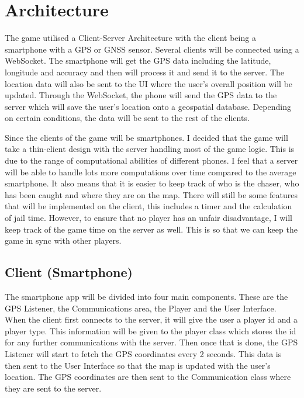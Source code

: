 \documentclass{l4proj}
\begin{document}
\section{Architecture}
\label{phase1architecture}
The game utilised a Client-Server Architecture with the client being a smartphone with a GPS or
GNSS sensor. Several clients will be connected using a WebSocket. The smartphone will get the GPS data including the
latitude, longitude and accuracy and then will process it and send it to the server. The location data will also be sent 
to the UI where the user's overall position will be updated. Through the WebSocket, the phone will send the GPS data
to the server which will save the user's location onto a geospatial database. Depending on certain conditions, the data
will be sent to the rest of the clients.

Since the clients of the game will be smartphones. I decided that the game will take a thin-client design with the
server handling most of the game logic. This is due to the range of computational abilities of different phones. 
I feel that a server will be able to handle lots more computations over time compared to the average smartphone.
It also means that it is easier to keep track of who is the chaser, who has been caught and where they are on the map.
There will still be some features that will be implemented on the client, this includes a timer and the calculation of
jail time. However, to ensure that no player has an unfair disadvantage, I will keep track of the game time on the
server as well. This is so that we can keep the game in sync with other players.

\subsection{Client (Smartphone)}
\label{designClient}
The smartphone app will be divided into four main components. These are the GPS Listener, the Communications area, the
Player and the User Interface. When the client first connects to the server, it will give the user a player id and a player
type. This information will be given to the player class which stores the id for any further communications with the server.
Then once that is done, the GPS Listener will start to fetch the GPS coordinates every 2 seconds. This data is then sent
to the User Interface so that the map is updated with the user's location. The GPS coordinates are then sent to the Communication
class where they are sent to the server.
\end{document}
